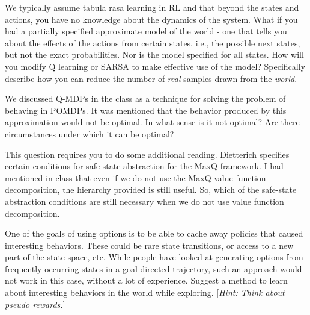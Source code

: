 \documentclass[addpoints,12pt,solution]{exam}
\begin{document}
\begin{questions}
\begin{enumerate}[label=(\alph*)]
\begin{solution}
    \end{solution}
\end{enumerate}


\question[5] We typically assume tabula rasa learning in RL and that beyond the states and actions, you have no knowledge about the dynamics of the system. What if you had a partially specified approximate model of the world - one that tells you about the effects of the actions from certain states, i.e., the possible next states, but not the exact probabilities. Nor is the model specified for all states. How will you modify Q learning or SARSA to make effective use of the model? Specifically describe how you can reduce the number of \textit{real} samples drawn from the \textit{world}.
\begin{solution}


\end{solution}

\question[4] We discussed Q-MDPs in the class as a technique for solving the problem of behaving in POMDPs. It was mentioned that the behavior produced by this approximation would not be optimal. In what sense is it not optimal? Are there circumstances under which it can be optimal?

\begin{solution}

\end{solution}

\question[3] This question requires you to do some additional reading. Dietterich specifies certain conditions for safe-state abstraction for the MaxQ framework. I had mentioned in class that even if we do not use the MaxQ value function decomposition, the hierarchy provided is still useful. So, which of the safe-state abstraction conditions are still necessary when we do not use value function decomposition.
\begin{solution}


\end{solution}

\question[4] One of the goals of using options is to be able to cache away policies that caused interesting behaviors. These could be rare state transitions, or access to a new part of the state space, etc. While people have looked at generating options from frequently occurring states in a goal-directed trajectory, such an approach would not work in this case, without a lot of experience. Suggest a method to learn about interesting behaviors in the world while exploring. [\textit{Hint: Think about pseudo rewards.}]
\begin{solution}

\end{solution}

\end{questions}
\end{document}
